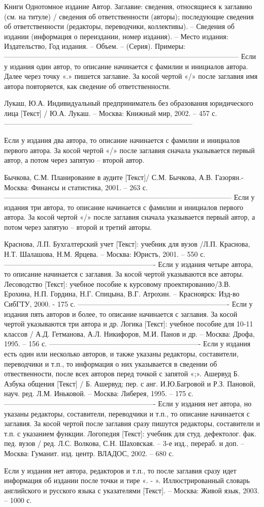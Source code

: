 Книги
Однотомное издание
Автор. Заглавие: сведения, относящиеся к заглавию (см. на титуле) / сведения об
ответственности (авторы); последующие сведения об ответственности (редакторы,
переводчики, коллективы). – Сведения об издании (информация о переиздании, номер
издания). – Место издания: Издательство, Год издания. – Объем. – (Серия).
Примеры:
---------------------------------------------------------------------------------------------------
Если у издания один автор, то описание начинается с фамилии и инициалов автора.
Далее через точку «.» пишется заглавие. За косой чертой «/» после заглавия имя
автора повторяется, как сведение об ответственности.

Лукаш, Ю.А. Индивидуальный предприниматель без образования юридического лица [Текст]
/ Ю.А. Лукаш.    – Москва: Книжный мир, 2002. – 457 с.
--------------------------------------------------------------------------------

Если у издания два автора, то описание начинается с фамилии и инициалов первого автора.
За косой чертой «/» после заглавия сначала указывается первый автор, а потом через запятую – второй автор.

Бычкова, С.М. Планирование в аудите [Текст]/ С.М. Бычкова, А.В. Газорян.-Москва:  Финансы и статистика, 2001. – 263 с.
------------------------------------------------------------------------------------------------
Если у издания три автора, то описание начинается с фамилии и инициалов первого автора.
 За косой чертой «/» после заглавия сначала указывается первый автор, а потом через запятую – второй и третий авторы.

Краснова, Л.П. Бухгалтерский учет [Текст]: учебник для вузов /Л.П. Краснова, Н.Т. Шалашова,  Н.М. Ярцева. – Москва: Юристъ, 2001. – 550 с.
----------------------------------------------------------------
Если у издания четыре автора, то описание начинается с заглавия. За косой чертой указываются все авторы.
Лесоводство [Текст]: учебное пособие к курсовому проектированию/З.В. Ерохина, Н.П. Гордина, Н.Г. Спицына, В.Г. Атрохин.  –   Красноярск: Изд-во СибГТУ, 2000. - 175 с.
----------------------------------------------------------------
Если у издания  пять авторов и более, то описание начинается с заглавия. За косой чертой указываются  три автора и др.
Логика [Текст]: учебное пособие для 10-11 классов / А.Д. Гетманова, А.Л. Никифоров, М.И. Панов и др. – Москва: Дрофа, 1995. – 156 с.
----------------------------------------------------------------
Если у издания есть один или несколько авторов, и также указаны редакторы, составители, переводчики и т.п., то информация о них указывается в сведении об отвественности, после всех авторов перед точкой с запятой «;».
Ашервуд Б. Азбука общения [Текст]  / Б. Ашервуд; пер. с анг. И.Ю.Багровой и Р.З. Пановой, науч. ред. Л.М. Иньковой. – Москва: Либерея, 1995. – 175 с.
----------------------------------------------------------------
Если у издания нет автора, но указаны редакторы, составители, переводчики и т.п., то описание начинается с заглавия. За косой чертой после заглавия сразу пишутся редакторы, составители и т.п. с указанием функции.
Логопедия [Текст]: учебник для студ. дефектолог. фак. пед. вузов / ред. Л.С. Волкова, С.Н. Шаховская. – 3-е изд., перераб. и доп. – Москва: Гуманит. изд. центр. ВЛАДОС, 2002. – 680 с.

Если у издания нет автора, редакторов и т.п., то после заглавия сразу идет информация об издании после точки и тире «. -  ».
Иллюстрированный словарь английского и русского языка с указателями [Текст].  – Москва: Живой язык, 2003. – 1000 с.
